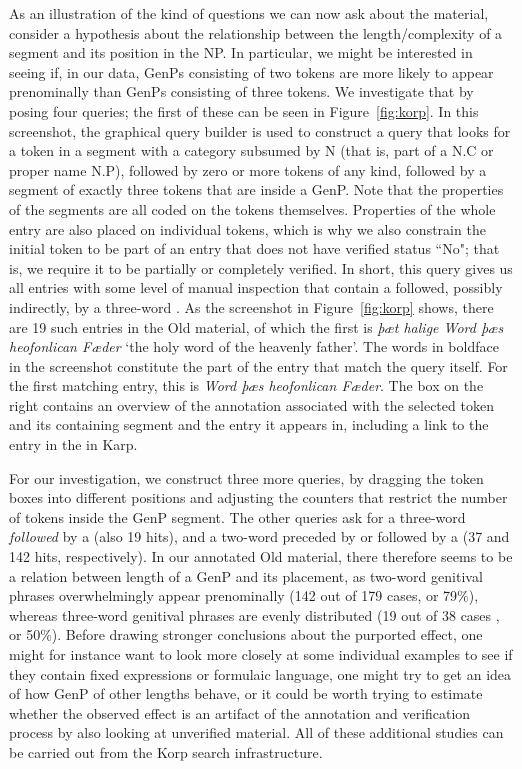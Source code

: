 \documentclass[output=paper,colorlinks,citecolor=brown]{langscibook}
\begin{document}
As an illustration of the kind of questions we can now ask about the material, consider a hypothesis about the relationship between the length/complexity of a segment and its position in the NP. In particular, we might be interested in seeing if, in our data, GenPs consisting of two tokens are more likely to appear prenominally than GenPs consisting of three tokens. We investigate that by posing four queries; the first of these can be seen in Figure~\ref{fig:korp}. In this screenshot, the graphical query builder is used to construct a query that looks for a token in a segment with a category subsumed by N (that is, part of a  N.C or proper name N.P), followed by zero or more tokens of any kind, followed by a segment of exactly three tokens that are inside a GenP. Note that the properties of the segments are all coded on the tokens themselves. Properties of the whole entry are also placed on individual tokens, which is why we also constrain the initial token to be part of an entry that does not have verified status ``No"; that is, we require it to be partially or completely verified. In short, this query gives us all entries with some level of manual inspection that contain a  followed, possibly indirectly, by a three-word . As the screenshot in Figure~\ref{fig:korp} shows, there are 19 such entries in the Old  material, of which the first is \textit{þæt halige Word þæs heofonlican Fæder} `the holy word of the heavenly father'. The words in boldface in the screenshot constitute the part of the entry that match the query itself. For the first matching entry, this is \textit{Word þæs heofonlican Fæder}. The box on the right contains an overview of the annotation associated with the selected token and its containing segment and the entry it appears in, including a link to the entry in the  in Karp. 

For our investigation, we construct three more queries, by dragging the token boxes into different positions and adjusting the counters that restrict the number of tokens inside the GenP segment. The other queries ask for a three-word  \textit{followed} by a  (also 19 hits), and a two-word  preceded by or followed by a  (37 and 142 hits, respectively). In our annotated Old  material, there therefore seems to be a relation between length of a GenP and its placement, as two-word genitival phrases overwhelmingly appear prenominally (142 out of 179 cases, or 79\%), whereas three-word genitival phrases are evenly distributed (19 out of 38 cases , or 50\%). Before drawing stronger conclusions about the purported effect, one might for instance want to look more closely at some individual examples to see if they contain fixed expressions or formulaic language, one might try to get an idea of how GenP of other lengths behave, or it could be worth trying to estimate whether the observed effect is an artifact of the annotation and verification process by also looking at unverified material. All of these additional studies can be carried out from the Korp search infrastructure.
\end{document}
